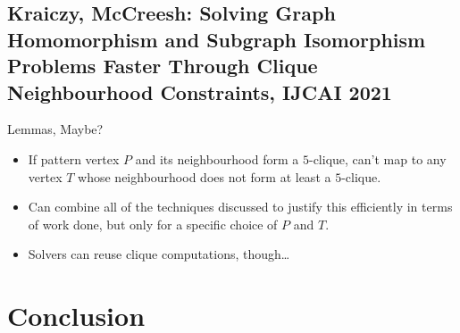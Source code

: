\documentclass[aspectratio=169,compress,10pt]{beamer}
\begin{document}
\subsection{Kraiczy, McCreesh: Solving Graph Homomorphism and Subgraph Isomorphism Problems Faster Through Clique Neighbourhood Constraints, IJCAI 2021}

\begin{frame}{Lemmas, Maybe?}
    \begin{itemize}
        \item If pattern vertex $P$ and its neighbourhood form a $5$-clique,
            can't map to any vertex $T$ whose neighbourhood does not form at
            least a $5$-clique.
        \item Can combine all of the techniques discussed to justify this efficiently in terms of
            work done, but only for a specific choice of $P$ and $T$.
        \item Solvers can reuse clique computations, though\ldots
    \end{itemize}
\end{frame}

\section{Conclusion}
\end{document}
